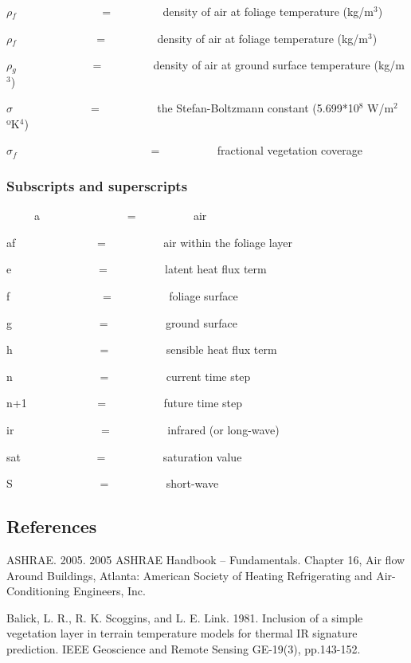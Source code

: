 \(\rho\)\(_{f}\)~ ~~~~~~~~~~~~~ = ~~~~~~~~ density of air at foliage temperature (kg/m\(^{3}\))

\(\rho\)\(_{f}\)~ ~~~~~~~~~~~~ = ~~~~~~~~ density of air at foliage temperature (kg/m\(^{3}\))

\(\rho\)\(_{g}\)~~~~~~~~~~~~~ = ~~~~~~~~ density of air at ground surface temperature (kg/m\(^{3}\))

\(\sigma\) ~ ~~~~~~~~~~~ = ~~~~~~~~~ the Stefan-Boltzmann constant (5.699*10\(^{8}\) W/m\(^{2}\) ºK\(^{4}\))

\(\sigma\)\(_f\) ~~~~~~~~~~~ ~~~~~~~~~~~ = ~~~~~~~~~ fractional vegetation coverage

\subsubsection{Subscripts and superscripts}\label{subscripts-and-superscripts-000}

~~~~~a~~~~~~~~~~~~~~~ = ~~~~~~~~~ air

af~~~~~~~~~~~~~~ = ~~~~~~~~~ air within the foliage layer

e~~~~~~~~~~~~~~~ = ~~~~~~~~~ latent heat flux term

f~~~~~~~~~~~~~~~~ = ~~~~~~~~~ foliage surface

g~~~~~~~~~~~~~~~ = ~~~~~~~~~ ground surface

h~~~~~~~~~~~~~~~ = ~~~~~~~~~ sensible heat flux term

n~~~~~~~~~~~~~~~ = ~~~~~~~~~ current time step

n+1~~~~~~~~~~~~ = ~~~~~~~~~ future time step

ir~~~~~~~~~~~~~~~ = ~~~~~~~~~ infrared (or long-wave)

sat~~~~~~~~~~~~~ = ~~~~~~~~~ saturation value

S~~~~~~~~~~~~~~~ = ~~~~~~~~~ short-wave

\subsection{References}\label{references-025}

ASHRAE. 2005. 2005 ASHRAE Handbook -- Fundamentals. Chapter 16, Air flow Around Buildings, Atlanta: American Society of Heating Refrigerating and Air-Conditioning Engineers, Inc.

Balick, L. R., R. K. Scoggins, and L. E. Link. 1981. Inclusion of a simple vegetation layer in terrain temperature models for thermal IR signature prediction. IEEE Geoscience and Remote Sensing GE-19(3), pp.143-152.

